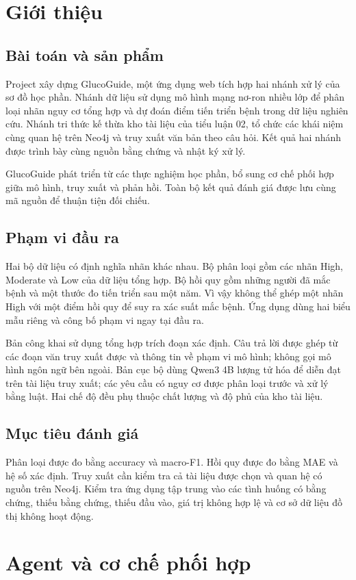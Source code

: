 \chapter{Giới thiệu}
\section{Bài toán và sản phẩm}
Project xây dựng GlucoGuide, một ứng dụng web tích hợp hai nhánh xử lý của sơ đồ học phần. Nhánh dữ liệu sử dụng mô hình mạng nơ-ron nhiều lớp để phân loại nhãn nguy cơ tổng hợp và dự đoán điểm tiến triển bệnh trong dữ liệu nghiên cứu. Nhánh tri thức kế thừa kho tài liệu của tiểu luận 02, tổ chức các khái niệm cùng quan hệ trên Neo4j và truy xuất văn bản theo câu hỏi. Kết quả hai nhánh được trình bày cùng nguồn bằng chứng và nhật ký xử lý.

GlucoGuide phát triển từ các thực nghiệm học phần, bổ sung cơ chế phối hợp giữa mô hình, truy xuất và phản hồi. Toàn bộ kết quả đánh giá được lưu cùng mã nguồn để thuận tiện đối chiếu.
\section{Phạm vi đầu ra}
Hai bộ dữ liệu có định nghĩa nhãn khác nhau. Bộ phân loại gồm các nhãn High, Moderate và Low của dữ liệu tổng hợp. Bộ hồi quy gồm những người đã mắc bệnh và một thước đo tiến triển sau một năm. Vì vậy không thể ghép một nhãn High với một điểm hồi quy để suy ra xác suất mắc bệnh. Ứng dụng dùng hai biểu mẫu riêng và công bố phạm vi ngay tại đầu ra.

Bản công khai sử dụng tổng hợp trích đoạn xác định. Câu trả lời được ghép từ các đoạn văn truy xuất được và thông tin về phạm vi mô hình; không gọi mô hình ngôn ngữ bên ngoài. Bản cục bộ dùng Qwen3 4B lượng tử hóa để diễn đạt trên tài liệu truy xuất; các yêu cầu có nguy cơ được phân loại trước và xử lý bằng luật. Hai chế độ đều phụ thuộc chất lượng và độ phủ của kho tài liệu.
\section{Mục tiêu đánh giá}
Phân loại được đo bằng accuracy và macro-F1. Hồi quy được đo bằng MAE và hệ số xác định. Truy xuất cần kiểm tra cả tài liệu được chọn và quan hệ có nguồn trên Neo4j. Kiểm tra ứng dụng tập trung vào các tình huống có bằng chứng, thiếu bằng chứng, thiếu đầu vào, giá trị không hợp lệ và cơ sở dữ liệu đồ thị không hoạt động.
\chapter{Agent và cơ chế phối hợp}
